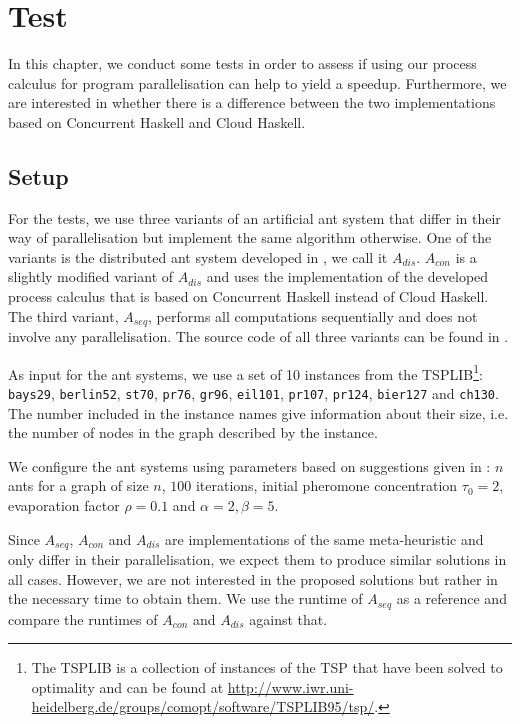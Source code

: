 \chapter{Test}
\label{chp:test}
\vspace*{-0.5em}
In this chapter, we conduct some tests in order to assess if using our process calculus for program parallelisation can help to yield a speedup. Furthermore, we are interested in whether there is a difference between the two implementations based on \textsf{Concurrent Haskell} and \textsf{Cloud Haskell}.

\section{Setup}
\vspace*{-0.5em}
For the tests, we use three variants of an artificial ant system that differ in their way of parallelisation but implement the same algorithm otherwise. One of the variants is the distributed ant system developed in , we call it $A_{dis}$. $A_{con}$ is a slightly modified variant of $A_{dis}$ and uses the implementation of the developed process calculus that is based on \textsf{Concurrent Haskell} instead of \textsf{Cloud Haskell}. The third variant, $A_{seq}$, performs all computations sequentially and does not involve any parallelisation. The source code of all three variants can be found in .

As input for the ant systems, we use a set of 10 instances from the TSPLIB\footnote{The TSPLIB is a collection of instances of the \textsc{TSP} that have been solved to optimality and can be found at \url{http://www.iwr.uni-heidelberg.de/groups/comopt/software/TSPLIB95/tsp/}.}: \texttt{bays29}, \texttt{berlin52}, \texttt{st70}, \texttt{pr76}, \texttt{gr96}, \texttt{eil101}, \texttt{pr107}, \texttt{pr124}, \texttt{bier127} and \texttt{ch130}. The number included in the instance names give information about their size, i.e. the number of nodes in the graph described by the instance.

We configure the ant systems using parameters based on suggestions given in \cite{Dorigo:2004:ACO:975277}: $n$ ants for a graph of size $n$, $100$ iterations, initial pheromone concentration $\tau_0 = 2$, evaporation factor $\rho = 0.1$ and $\alpha = 2, \beta = 5$.

Since $A_{seq}$, $A_{con}$ and $A_{dis}$ are implementations of the same meta-heuristic and only differ in their parallelisation, we expect them to produce similar solutions in all cases. However, we are not interested in the proposed solutions but rather in the necessary time to obtain them. We use the runtime of $A_{seq}$ as a reference and compare the runtimes of $A_{con}$ and $A_{dis}$ against that.

